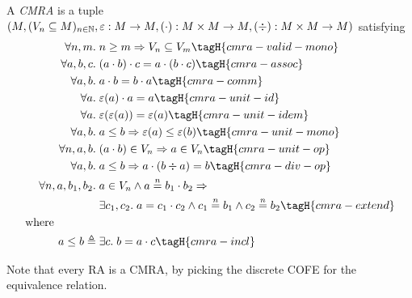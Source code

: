 \begin{defn}
  A \emph{CMRA} is a tuple $(M, (V_n \subseteq M)_{n \in \mathbb{N}}, \mathord{\varepsilon}: M \to M, (\mathbin{\cdot}) : M \times M \to M, (\mathbin{\div}) : M \times M \to M)$ satisfying
  \begin{align*}
    \All n, m.& n \geq m \Ra V_n \subseteq V_m \tagH{cmra-valid-mono} \\
    \All \melt, \meltB, \meltC.& (\melt \mtimes \meltB) \mtimes \meltC = \melt \mtimes (\meltB \mtimes \meltC) \tagH{cmra-assoc} \\
    \All \melt, \meltB.& \melt \mtimes \meltB = \meltB \mtimes \melt \tagH{cmra-comm} \\
    \All \melt.& \munit(\melt) \mtimes \melt = \melt \tagH{cmra-unit-id} \\
    \All \melt.& \munit(\munit(\melt)) = \munit(\melt) \tagH{cmra-unit-idem} \\
    \All \melt, \meltB.& \melt \leq \meltB \Ra \munit(\melt) \leq \munit(\meltB) \tagH{cmra-unit-mono} \\
    \All n, \melt, \meltB.& (\melt \mtimes \meltB) \in \mval_n \Ra \melt \in \mval_n \tagH{cmra-unit-op} \\
    \All \melt, \meltB.& \melt \leq \meltB \Ra \melt \mtimes (\meltB \mdiv \melt) = \meltB \tagH{cmra-div-op} \\
    \All n, \melt, \meltB_1, \meltB_2.& \omit\rlap{$\melt \in \mval_n \land \melt \nequiv{n} \meltB_1 \mtimes \meltB_2 \Ra {}$} \\
    &\Exists \meltC_1, \meltC_2. \melt = \meltC_1 \mtimes \meltC_2 \land \meltC_1 \nequiv{n} \meltB_1 \land \meltC_2 \nequiv{n} \meltB_2 \tagH{cmra-extend} \\
    \text{where}\qquad\qquad\\
    \melt \leq \meltB \eqdef{}& \Exists \meltC. \meltB = \melt \mtimes \meltC \tagH{cmra-incl}
  \end{align*}
\end{defn}

Note that every RA is a CMRA, by picking the discrete COFE for the equivalence relation.


